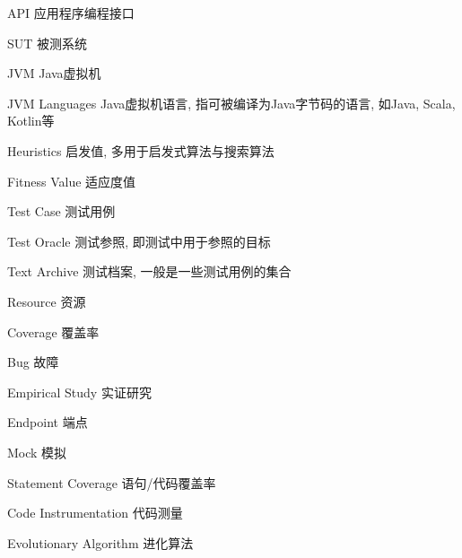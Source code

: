 \begin{denotation}[3cm]
\item[API] 应用程序编程接口
\item[SUT] 被测系统 
\item[JVM] Java虚拟机 
\item[JVM Languages] Java虚拟机语言, 指可被编译为Java字节码的语言, 如Java, Scala, Kotlin等 

\item[Heuristics] 启发值, 多用于启发式算法与搜索算法 
\item[Fitness Value] 适应度值 
\item[Test Case] 测试用例 
\item[Test Oracle] 测试参照, 即测试中用于参照的目标 
\item[Text Archive] 测试档案, 一般是一些测试用例的集合 
\item[Resource] 资源 
\item[Coverage] 覆盖率 
\item[Bug] 故障 
\item[Empirical Study] 实证研究 
\item[Endpoint] 端点 
\item[Mock] 模拟 
\item[Statement Coverage] 语句/代码覆盖率 
\item[Code Instrumentation] 代码测量 
\item[Evolutionary Algorithm] 进化算法 
\end{denotation}
